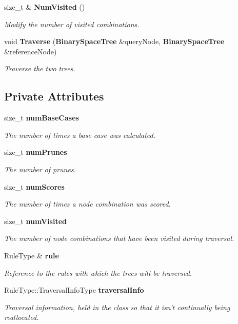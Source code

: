 \begin{DoxyCompactItemize}
size\-\_\-t \& {\bf Num\-Visited} ()
\begin{DoxyCompactList}\small\item\em Modify the number of visited combinations. \end{DoxyCompactList}\item 
void {\bf Traverse} ({\bf Binary\-Space\-Tree} \&query\-Node, {\bf Binary\-Space\-Tree} \&reference\-Node)
\begin{DoxyCompactList}\small\item\em Traverse the two trees. \end{DoxyCompactList}\end{DoxyCompactItemize}
\subsection*{Private Attributes}
\begin{DoxyCompactItemize}
\item 
size\-\_\-t {\bf num\-Base\-Cases}
\begin{DoxyCompactList}\small\item\em The number of times a base case was calculated. \end{DoxyCompactList}\item 
size\-\_\-t {\bf num\-Prunes}
\begin{DoxyCompactList}\small\item\em The number of prunes. \end{DoxyCompactList}\item 
size\-\_\-t {\bf num\-Scores}
\begin{DoxyCompactList}\small\item\em The number of times a node combination was scored. \end{DoxyCompactList}\item 
size\-\_\-t {\bf num\-Visited}
\begin{DoxyCompactList}\small\item\em The number of node combinations that have been visited during traversal. \end{DoxyCompactList}\item 
Rule\-Type \& {\bf rule}
\begin{DoxyCompactList}\small\item\em Reference to the rules with which the trees will be traversed. \end{DoxyCompactList}\item 
Rule\-Type\-::\-Traversal\-Info\-Type {\bf traversal\-Info}
\begin{DoxyCompactList}\small\item\em Traversal information, held in the class so that it isn't continually being reallocated. \end{DoxyCompactList}\end{DoxyCompactItemize}


